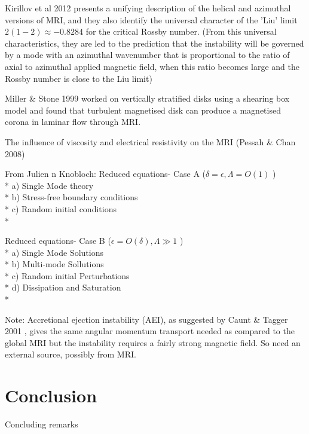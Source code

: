 \documentclass{jfm}
\begin{document}
Kirillov et al 2012  \cite{Kirillov2012} presents a unifying description of the helical and azimuthal versions of MRI, and they also identify the universal character of the 'Liu' limit $2(1 - 2) \approx - 0.8284$ for the critical Rossby number. (From this universal characteristics, they are led to the prediction that the instability will be governed by a mode with an azimuthal wavenumber that is proportional to the ratio of axial to azimuthal applied magnetic field, when this ratio becomes large and the Rossby number is close to the Liu limit)

Miller \& Stone 1999 \cite{Miller1999} worked on vertically stratified disks using a shearing box model and found that turbulent magnetised disk can produce a magnetised corona in laminar flow through MRI.

The influence of viscosity and electrical resistivity on the MRI (Pessah \& Chan 2008) \cite{Pessah2008}
  
From Julien n Knobloch: Reduced equations- Case A ($ \delta = \epsilon, \Lambda = O(1) $ )\\*
 a) Single Mode theory \\*
 b) Stress-free boundary conditions \\*
 c) Random initial conditions \\*
 
 Reduced equations- Case B ($  \epsilon =O( \delta), \Lambda \gg 1 $ ) \\*
 a) Single Mode Solutions \\*
 b) Multi-mode Sollutions \\*
 c) Random initial Perturbations \\*
 d) Dissipation and Saturation \\*
 
Note: Accretional ejection instability (AEI), as suggested by Caunt \& Tagger 2001 \cite{Caunt2011}, gives the same angular momentum transport needed as compared to the global MRI but the instability requires a fairly strong magnetic field. So need an external source, possibly from MRI.



\section{Conclusion}
Concluding remarks





\end{document}
